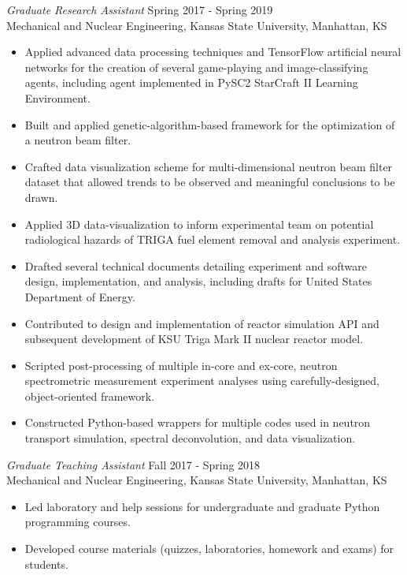 \documentclass[margin, 10pt]{res} %
\begin{document}
\begin{resume}
{\sl Graduate Research Assistant} \hfill Spring 2017 - Spring 2019 \\
Mechanical and Nuclear Engineering, Kansas State University, Manhattan, KS
\begin{itemize}
    \item Applied advanced data processing techniques and TensorFlow artificial neural networks for the creation of several game-playing and image-classifying agents, including agent implemented in PySC2 StarCraft II Learning Environment.
    \item Built and applied genetic-algorithm-based framework for the optimization of a neutron beam filter.
    \item Crafted data visualization scheme for multi-dimensional neutron beam filter dataset that allowed trends to be observed and meaningful conclusions to be drawn.
    \item Applied 3D data-visualization to inform experimental team on potential radiological hazards of TRIGA fuel element removal and analysis experiment.
    \item Drafted several technical documents detailing experiment and software design, implementation, and analysis, including drafts for United States Department of Energy.
    \item Contributed to design and implementation of reactor simulation API and subsequent development of KSU Triga Mark II nuclear reactor model.
    \item Scripted post-processing of multiple in-core and ex-core, neutron spectrometric measurement experiment analyses using carefully-designed, object-oriented framework.
    \item Constructed Python-based wrappers for multiple codes used in neutron transport simulation, spectral deconvolution, and data visualization.
\end{itemize}

{\sl Graduate Teaching Assistant} \hfill Fall 2017 - Spring 2018 \\
Mechanical and Nuclear Engineering, Kansas State University, Manhattan, KS \\
\begin{itemize} \itemsep -2pt %
    \item Led laboratory and help sessions for undergraduate and graduate Python programming courses.
    \item Developed course materials (quizzes, laboratories, homework and exams) for students.
\end{itemize}



\end{resume}
\end{document}
